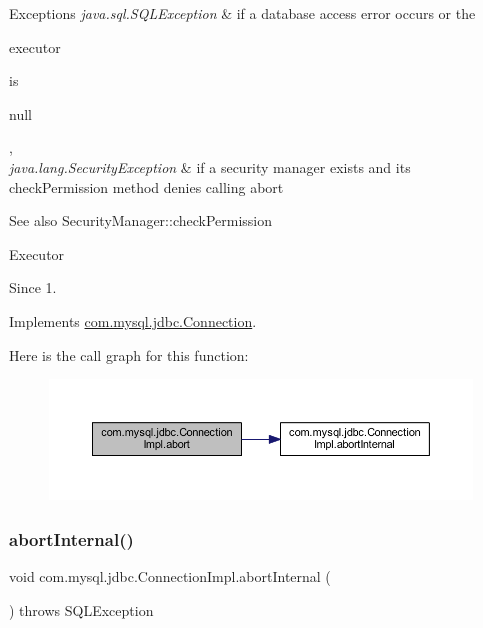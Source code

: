 \begin{DoxyExceptions}{Exceptions}
{\em java.\+sql.\+S\+Q\+L\+Exception} & if a database access error occurs or the
\begin{DoxyCode}
executor 
\end{DoxyCode}
 is
\begin{DoxyCode}
null 
\end{DoxyCode}
 , \\
\hline
{\em java.\+lang.\+Security\+Exception} & if a security manager exists and its {\ttfamily check\+Permission} method denies calling {\ttfamily abort} \\
\hline
\end{DoxyExceptions}
\begin{DoxySeeAlso}{See also}
Security\+Manager\+::check\+Permission 

Executor 
\end{DoxySeeAlso}
\begin{DoxySince}{Since}
1. 
\end{DoxySince}


Implements \mbox{\hyperlink{interfacecom_1_1mysql_1_1jdbc_1_1_connection}{com.\+mysql.\+jdbc.\+Connection}}.

Here is the call graph for this function\+:\nopagebreak
\begin{figure}[H]
\begin{center}
\leavevmode
\includegraphics[width=350pt]{classcom_1_1mysql_1_1jdbc_1_1_connection_impl_a44359ff304c24e670d6e0a1214c330cc_cgraph}
\end{center}
\end{figure}
\mbox{\label{classcom_1_1mysql_1_1jdbc_1_1_connection_impl_a551f5ee36eb1b4f78304057f63636243}} 
\subsubsection{\texorpdfstring{abort\+Internal()}{abortInternal()}}
{\footnotesize\ttfamily void com.\+mysql.\+jdbc.\+Connection\+Impl.\+abort\+Internal (\begin{DoxyParamCaption}{ }\end{DoxyParamCaption}) throws S\+Q\+L\+Exception}

